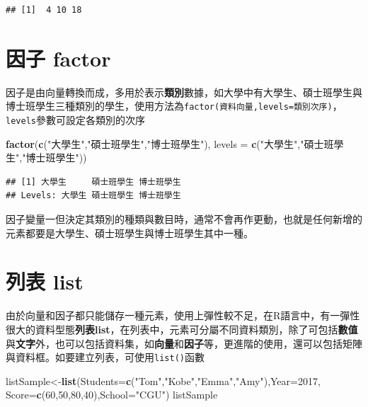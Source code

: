 \documentclass[]{book}
\newenvironment{Shaded}{\begin{snugshade}}{\end{snugshade}}
\newcommand{\KeywordTok}[1]{\textcolor[rgb]{0.13,0.29,0.53}{\textbf{{#1}}}}
\newcommand{\DataTypeTok}[1]{\textcolor[rgb]{0.13,0.29,0.53}{{#1}}}
\newcommand{\DecValTok}[1]{\textcolor[rgb]{0.00,0.00,0.81}{{#1}}}
\newcommand{\StringTok}[1]{\textcolor[rgb]{0.31,0.60,0.02}{{#1}}}
\newcommand{\NormalTok}[1]{{#1}}
\theoremstyle{definition}
\theoremstyle{definition}
\theoremstyle{remark}
\begin{document}
\begin{verbatim}
## [1]  4 10 18
\end{verbatim}

\section{因子 factor}\label{-factor}

因子是由向量轉換而成，多用於表示\textbf{類別}數據，如大學中有大學生、碩士班學生與博士班學生三種類別的學生，使用方法為\texttt{factor(資料向量,levels=類別次序)}，\texttt{levels}參數可設定各類別的次序

\begin{Shaded}
\begin{Highlighting}[]
\KeywordTok{factor}\NormalTok{(}\KeywordTok{c}\NormalTok{(}\StringTok{"大學生"}\NormalTok{,}\StringTok{"碩士班學生"}\NormalTok{,}\StringTok{"博士班學生"}\NormalTok{),}
       \DataTypeTok{levels =} \KeywordTok{c}\NormalTok{(}\StringTok{"大學生"}\NormalTok{,}\StringTok{"碩士班學生"}\NormalTok{,}\StringTok{"博士班學生"}\NormalTok{))}
\end{Highlighting}
\end{Shaded}

\begin{verbatim}
## [1] 大學生     碩士班學生 博士班學生
## Levels: 大學生 碩士班學生 博士班學生
\end{verbatim}

因子變量一但決定其類別的種類與數目時，通常不會再作更動，也就是任何新增的元素都要是大學生、碩士班學生與博士班學生其中一種。

\section{列表 list}\label{-list}

由於向量和因子都只能儲存一種元素，使用上彈性較不足，在R語言中，有一彈性很大的資料型態\textbf{列表list}，在列表中，元素可分屬不同資料類別，除了可包括\textbf{數值}與\textbf{文字}外，也可以包括資料集，如\textbf{向量}和\textbf{因子}等，更進階的使用，還可以包括矩陣與資料框。如要建立列表，可使用\texttt{list()}函數

\begin{Shaded}
\begin{Highlighting}[]
\NormalTok{listSample<-}\KeywordTok{list}\NormalTok{(}\DataTypeTok{Students=}\KeywordTok{c}\NormalTok{(}\StringTok{"Tom"}\NormalTok{,}\StringTok{"Kobe"}\NormalTok{,}\StringTok{"Emma"}\NormalTok{,}\StringTok{"Amy"}\NormalTok{),}\DataTypeTok{Year=}\DecValTok{2017}\NormalTok{,}
                 \DataTypeTok{Score=}\KeywordTok{c}\NormalTok{(}\DecValTok{60}\NormalTok{,}\DecValTok{50}\NormalTok{,}\DecValTok{80}\NormalTok{,}\DecValTok{40}\NormalTok{),}\DataTypeTok{School=}\StringTok{"CGU"}\NormalTok{)}
\NormalTok{listSample}
\end{Highlighting}
\end{Shaded}
\end{document}
